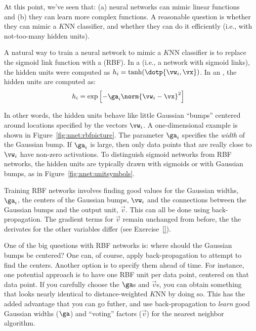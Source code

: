At this point, we've seen that: (a) neural networks can mimic linear
functions and (b) they can learn more complex functions.  A reasonable
question is whether they can mimic a $K$NN classifier, and whether
they can do it efficiently (i.e., with not-too-many hidden units).

A natural way to train a neural network to mimic a $K$NN classifier is
to replace the sigmoid link function with a  (RBF).  In a  (i.e., a network
with sigmoid links), the hidden units were computed as $h_i =
\tanh(\dotp{\vw_i,\vx})$.  In an , the hidden
units are computed as:
%
\begin{equation}
h_i = \exp\left[ - \ga_i \norm{\vw_i - \vx}^2 \right]
\end{equation}
%

%
In other words, the hidden units behave like little Gaussian ``bumps''
centered around locations specified by the vectors $\vw_i$.  A
one-dimensional example is shown in Figure~\ref{fig:nnet:rbfpicture}.
The parameter $\ga_i$ specifies the \emph{width} of the Gaussian bump.
If $\ga_i$ is large, then only data points that are really close to
$\vw_i$ have non-zero activations.  To distinguish sigmoid networks
from RBF networks, the hidden units are typically drawn with sigmoids
or with Gaussian bumps, as in Figure~\ref{fig:nnet:unitsymbols}.

Training RBF networks involves finding good values for the Gaussian
widths, $\ga_i$, the centers of the Gaussian bumps, $\vw_i$ and the
connections between the Gaussian bumps and the output unit, $\vec v$.
This can all be done using back-propagation.  The gradient terms for
$\vec v$ remain unchanged from before, the the derivates for the other
variables differ (see Exercise~\ref{}).

One of the big questions with RBF networks is: where should the
Gaussian bumps be centered?  One can, of course, apply
back-propagation to attempt to find the centers.  Another option is to
specify them ahead of time.  For instance, one potential approach is
to have one RBF unit per data point, centered on that data point.  If
you carefully choose the $\ga$s and $\vec v$s, you can obtain
something that looks nearly identical to distance-weighted $K$NN by
doing so.  This has the added advantage that you can go futher, and
use back-propagation to \emph{learn} good Gaussian widths ($\ga$) and
``voting'' factors ($\vec v$) for the nearest neighbor algorithm.

